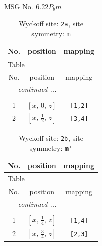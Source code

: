 \documentclass[fleqn,8pt]{jsarticle}
\begin{document}
\setcounter{MaxMatrixCols}{32}

\renewcommand{\tablename}{Table~}
\renewcommand{\figurename}{Figure~}
\begin{center}
\LARGE
MSG No. 6.22\quad$P_{b}m$
\end{center}
\renewcommand{\arraystretch}{1.2}
\begin{longtable}{ccc}
\caption{Wyckoff site: {\tt 2a}, site symmetry: {\tt m}}
 \\
 \hline \hline
No. & position & mapping \\ \hline \endfirsthead

\multicolumn{2}{l}{\tablename\ \thetable{}} \\
 \hline \hline
No. & position & mapping \\ \hline \endhead

 \hline \hline
\multicolumn{2}{r}{\footnotesize\it continued ...} \\ \endfoot

 \hline \hline
\multicolumn{2}{r}{} \\ \endlastfoot

1 & $\left[ x,\, 0,\, z \right]$ & {\tt [1,2]} \\ \hline
2 & $\left[ x,\, \frac{1}{2},\, z \right]$ & {\tt [3,4]} \\
\end{longtable}
\renewcommand{\arraystretch}{1.2}
\begin{longtable}{ccc}
\caption{Wyckoff site: {\tt 2b}, site symmetry: {\tt m'}}
 \\
 \hline \hline
No. & position & mapping \\ \hline \endfirsthead

\multicolumn{2}{l}{\tablename\ \thetable{}} \\
 \hline \hline
No. & position & mapping \\ \hline \endhead

 \hline \hline
\multicolumn{2}{r}{\footnotesize\it continued ...} \\ \endfoot

 \hline \hline
\multicolumn{2}{r}{} \\ \endlastfoot

1 & $\left[ x,\, \frac{1}{4},\, z \right]$ & {\tt [1,4]} \\ \hline
2 & $\left[ x,\, \frac{3}{4},\, z \right]$ & {\tt [2,3]} \\
\end{longtable}
\renewcommand{\arraystretch}{1.2}
\end{document}
